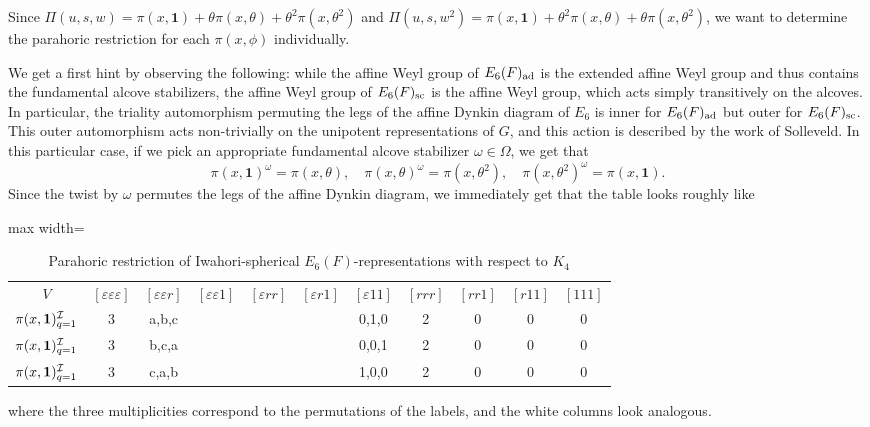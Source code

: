 Since $\Pi(u,s,w)=\pi(x,\mathbf{1})+\theta\pi(x,\theta)+\theta^2\pi(x,\theta^2)$ and $\Pi(u,s,w^2)=\pi(x,\mathbf{1})+\theta^2\pi(x,\theta)+\theta\pi(x,\theta^2)$, we want to determine the parahoric restriction for each $\pi(x,\phi)$ individually. 

We get a first hint by observing the following: while the affine Weyl group of $E_6(F)_{\mathrm{ad}}$ is the extended affine Weyl group and thus contains the fundamental alcove stabilizers, the affine Weyl group of $E_6(F)_{\mathrm{sc}}$ is the affine Weyl group, which acts simply transitively on the alcoves. In particular, the triality automorphism permuting the legs of the affine Dynkin diagram of $E_6$ is inner for $E_6(F)_{\mathrm{ad}}$ but outer for $E_6(F)_{\mathrm{sc}}$. This outer automorphism acts non-trivially on the unipotent representations of $G$, and this action is described by the work of Solleveld. In this particular case, if we pick an appropriate fundamental alcove stabilizer $\omega\in\Omega$, we get that 
$$\pi(x,\mathbf{1})^\omega=\pi(x,\theta),\quad\pi(x,\theta)^\omega=\pi(x,\theta^2),\quad\pi(x,\theta^2)^\omega=\pi(x,\mathbf{1}).$$
Since the twist by $\omega$ permutes the legs of the affine Dynkin diagram, we immediately get that the table looks roughly like

\begin{table}[ht]
    \centering
    \label{tab:worked_example_2}
    \begin{adjustbox}{max width=\linewidth}
    \begin{tabular}{|c|cccccccccc|}
    \hline
    $V$ & $[\varepsilon\varepsilon\varepsilon]$ & $[\varepsilon\varepsilon r]$ & $[\varepsilon\varepsilon 1]$ & $[\varepsilon r r]$ & $[\varepsilon r 1]$ & $[\varepsilon 1 1]$ & $[r r r]$ & $[r r 1]$ & $[r 1 1]$ & $[1 1 1]$ \\
    
    $\pi(x,\mathbf{1})^{\mathcal{I}}_{q=1}$         & 3 & a,b,c &  &  &  & 0,1,0 & 2 & 0 & 0 & 0 \\
    $\pi(x,\mathbf{1})^{\mathcal{I}}_{q=1}$         & 3 & b,c,a &  &  &  & 0,0,1 & 2 & 0 & 0 & 0 \\
    $\pi(x,\mathbf{1})^{\mathcal{I}}_{q=1}$         & 3 & c,a,b &  &  &  & 1,0,0 & 2 & 0 & 0 & 0 \\ \hline

    \end{tabular}
    \end{adjustbox}
    \caption{Parahoric restriction of Iwahori-spherical $E_6(F)$-representations with respect to $K_4$}
\end{table}
where the three multiplicities correspond to the permutations of the labels, and the white columns look analogous. 

